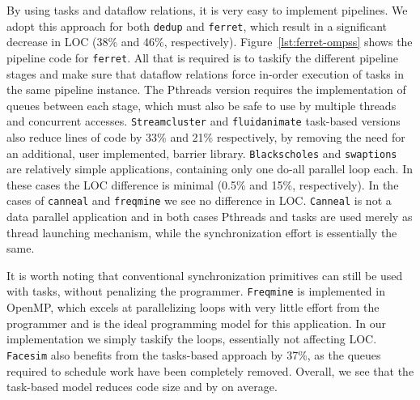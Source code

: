 By using tasks and dataflow relations, it is very easy to implement pipelines.  We adopt this approach for both \texttt{dedup} and \texttt{ferret}, 
which result in a significant decrease in LOC (38\% and 46\%, respectively). Figure~\ref{lst:ferret-ompss} shows the pipeline code for \texttt{ferret}.  All that is required is
to taskify the different pipeline stages and make sure that dataflow relations force in-order execution of tasks in the same pipeline instance. The Pthreads version requires the implementation
 of queues between each stage, which must also be safe to use by multiple threads and concurrent accesses.
\texttt{Streamcluster} and \texttt{fluidanimate} task-based versions also reduce lines of code by 33\% and 21\% respectively, by removing the need for an additional, user implemented, barrier library. 
\texttt{Blackscholes} and \texttt{swaptions} are relatively simple applications, containing only one do-all parallel loop each.
In these cases the LOC difference is minimal (0.5\% and 15\%, respectively). 
In the cases of \texttt{canneal} and \texttt{freqmine} we see no difference in LOC. 
\texttt{Canneal} is not a data parallel application and in both cases Pthreads and tasks are used merely as thread launching mechanism, while the synchronization effort is essentially the same. 

It is worth noting that conventional synchronization primitives can still be used with tasks, without penalizing the programmer.
\texttt{Freqmine} is implemented in OpenMP, which excels at parallelizing loops with very little effort from the programmer and is the ideal programming model for this application. 
In our implementation we simply taskify the loops, essentially not affecting LOC.
\texttt{Facesim} also benefits from the tasks-based approach by 37\%, as the queues required to schedule work have been 
completely removed. 
Overall, we see that the task-based model reduces code size and by \AVERAGELOC{} on average.


